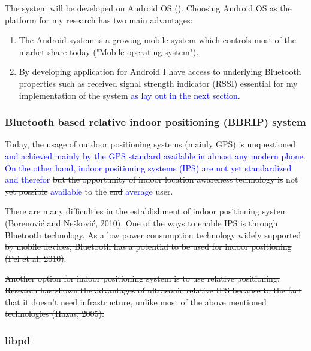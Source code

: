 \documentclass[a4paper,11pt]{article}
\newcommand{\new}[1]{\textcolor{blue}{#1}}
\begin{document}
The system will be developed on Android OS (). Choosing Android OS as the platform for my research has two main advantages:

\begin{enumerate}

	\item The Android system is a growing mobile system which controls most of the market share today ("Mobile operating system").

	\item By developing application for Android I have access to underlying Bluetooth properties such as received signal strength indicator (RSSI) essential for my implementation of the system \new{as lay out in the next section}.

\end{enumerate}

\subsubsection{Bluetooth based relative indoor positioning (BBRIP) system}


Today, the usage of outdoor positioning systems \st{(mainly GPS)} is unquestioned \new{and achieved mainly by the GPS standard available in almost any modern phone}. \new{On the other hand, indoor positioning systems (IPS) are not yet standardized and therefor} \st{but the opportunity of indoor location awareness technology is} not \st{yet possible} \new{available} to the \st{end} \new{average} user.


\st{There are many difficulties in the establishment of indoor positioning system (Borenović and Nešković, 2010). One of the ways to enable IPS is through Bluetooth technology. As a low power consumption technology widely supported by mobile devices, Bluetooth has a potential to be used for indoor positioning (Pei et al. 2010)}.

\st{Another option for indoor positioning system is to use relative positioning. Research has shown the advantages of ultrasonic relative IPS because to the fact that it doesn’t need infrastructure, unlike most of the above mentioned technologies (Hazas, 2005).}

\subsubsection{libpd}
\end{document}
